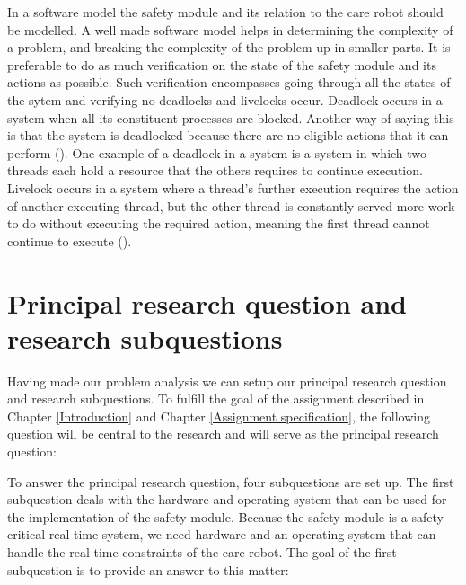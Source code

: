 \documentclass[12pt]{scrreprt}
\begin{document}
In a software model the safety module and its relation to the care robot should be modelled. A well made software model helps in determining the complexity of a problem, and breaking the complexity of the problem up in smaller parts. It is preferable to do as much verification on the state of the safety module and its actions as possible. Such verification encompasses going through all the states of the sytem and verifying no deadlocks and livelocks occur.
Deadlock occurs in a system when all its constituent processes are blocked. Another way of saying this is that the system is deadlocked because there are no eligible actions that it can perform (\cite{ltsa}). One example of a deadlock in a system is a system in which two threads each hold a resource that the others requires to continue execution. Livelock occurs in a system where a thread's further execution requires the action of another executing thread, but the other thread is constantly served more work to do without executing the required action, meaning the first thread cannot continue to execute (\cite{livelock_starvation}).
\par
\par

\section{Principal research question and research subquestions}
\label{Principal research question and research subquestions}
Having made our problem analysis we can setup our principal research question and research subquestions. To fulfill the goal of the assignment described in Chapter \ref{Introduction} and Chapter \ref{Assignment specification}, the following question will be central to the research and will serve as the principal research question:

\begin{flushleft}
\textit{\mq}
\end{flushleft}

To answer the principal research question, four subquestions are set up. The first subquestion deals with the hardware and operating system that can be used for the implementation of the safety module. Because the safety module is a safety critical real-time system, we need hardware and an operating system that can handle the real-time constraints of the care robot. The goal of the first subquestion is to provide an answer to this matter:
\end{document}
